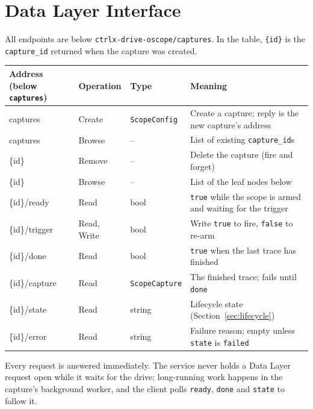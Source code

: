\documentclass[11pt,a4paper]{article}
\newcommand{\dl}[1]{\texttt{#1}}
\newcommand{\capsroot}{\dl{ctrlx-drive-oscope/captures}}
\begin{document}
\section{Data Layer Interface}

All endpoints are below \capsroot. In the table, \dl{\{id\}} is the
\dl{capture\_id} returned when the capture was created.

\begin{center}
\small
\begin{tabularx}{\textwidth}{@{}>{\ttfamily}l l l X@{}}
\toprule
\normalfont Address (below \dl{captures}) & Operation & Type & Meaning \\
\midrule
captures             & Create  & \dl{ScopeConfig} & Create a capture; reply is the new capture's address \\
captures             & Browse  & --               & List of existing \dl{capture\_id}s \\
\{id\}               & Remove  & --               & Delete the capture (fire and forget) \\
\{id\}               & Browse  & --               & List of the leaf nodes below \\
\{id\}/ready         & Read    & bool             & \dl{true} while the scope is armed and waiting for the trigger \\
\{id\}/trigger       & Read, Write & bool         & Write \dl{true} to fire, \dl{false} to re-arm \\
\{id\}/done          & Read    & bool             & \dl{true} when the last trace has finished \\
\{id\}/capture       & Read    & \dl{ScopeCapture} & The finished trace; fails until \dl{done} \\
\{id\}/state         & Read    & string           & Lifecycle state (Section~\ref{sec:lifecycle}) \\
\{id\}/error         & Read    & string           & Failure reason; empty unless \dl{state} is \dl{failed} \\
\bottomrule
\end{tabularx}
\end{center}

Every request is answered immediately. The service never holds a Data Layer
request open while it waits for the drive; long-running work happens in the
capture's background worker, and the client polls \dl{ready}, \dl{done} and
\dl{state} to follow it.
\end{document}
